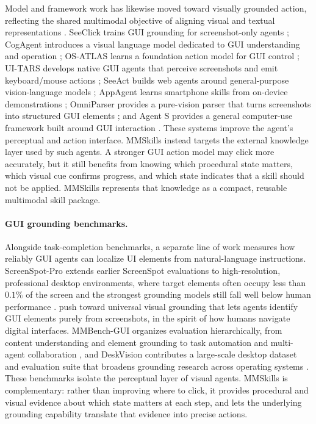 \documentclass{llmxive}
\begin{document}
Model and framework work has likewise moved toward visually grounded action, reflecting the shared multimodal objective of aligning visual and textual representations \citep{liu2024alignrecaligningtrainingmultimodalrecommendations,zhang2024dreamdualrepresentationlearningmodel}. SeeClick trains GUI grounding for screenshot-only agents \citep{cheng2024seeclick}; CogAgent introduces a visual language model dedicated to GUI understanding and operation \citep{hong2024cogagentvisuallanguagemodel}; OS-ATLAS learns a foundation action model for GUI control \citep{wu2024osatlas}; UI-TARS develops native GUI agents that perceive screenshots and emit keyboard/mouse actions \citep{qin2025uitars}; SeeAct builds web agents around general-purpose vision-language models \citep{zheng2024gpt4visiongeneralistwebagent}; AppAgent learns smartphone skills from on-device demonstrations \citep{zhang2023appagentmultimodalagentssmartphone}; OmniParser provides a pure-vision parser that turns screenshots into structured GUI elements \citep{lu2024omniparserpurevisionbased}; and Agent S provides a general computer-use framework built around GUI interaction \citep{agashe2024agents}. These systems improve the agent's perceptual and action interface. MMSkills instead targets the external knowledge layer used by such agents. A stronger GUI action model may click more accurately, but it still benefits from knowing which procedural state matters, which visual cue confirms progress, and which state indicates that a skill should not be applied. MMSkills represents that knowledge as a compact, reusable multimodal skill package.

\paragraph{GUI grounding benchmarks.}
Alongside task-completion benchmarks, a separate line of work measures how reliably GUI agents can localize UI elements from natural-language instructions. ScreenSpot-Pro extends earlier ScreenSpot evaluations to high-resolution, professional desktop environments, where target elements often occupy less than $0.1\%$ of the screen and the strongest grounding models still fall well below human performance \citep{li2025screenspotproguigroundingprofessional}. \citet{gou2025navigatingdigitalworldhumans} push toward universal visual grounding that lets agents identify GUI elements purely from screenshots, in the spirit of how humans navigate digital interfaces. MMBench-GUI organizes evaluation hierarchically, from content understanding and element grounding to task automation and multi-agent collaboration \citep{wang2025mmbenchguihierarchicalmultiplatformevaluation}, and DeskVision contributes a large-scale desktop dataset and evaluation suite that broadens grounding research across operating systems \citep{xu2025deskvisionlargescaledesktop}. These benchmarks isolate the perceptual layer of visual agents. MMSkills is complementary: rather than improving where to click, it provides procedural and visual evidence about which state matters at each step, and lets the underlying grounding capability translate that evidence into precise actions.
\end{document}
